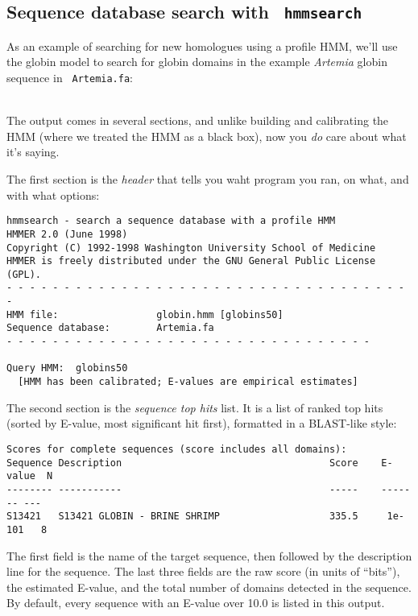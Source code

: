 \documentclass[11pt]{report}
\newcommand{\prog}[1]{\texttt{#1}}
\newcommand{\user}[1]{\noindent{\small\bfseries\texttt{$>$ #1}}\\}
\begin{document}
\subsection{Sequence database search with \prog{ hmmsearch}}

As an example of searching for new homologues using a profile HMM,
we'll use the globin model to search for globin domains in the example
{\em Artemia} globin sequence in \prog{ Artemia.fa}:

\vspace{1.5em}
\user{hmmsearch globin.hmm Artemia.fa}

The output comes in several sections, and unlike building and
calibrating the HMM (where we treated the HMM as a black box), now you
{\em do} care about what it's saying.

The first section is the {\em header} that tells you waht program you
ran, on what, and with what options:

{\small\begin{verbatim}
hmmsearch - search a sequence database with a profile HMM
HMMER 2.0 (June 1998)
Copyright (C) 1992-1998 Washington University School of Medicine
HMMER is freely distributed under the GNU General Public License (GPL).
- - - - - - - - - - - - - - - - - - - - - - - - - - - - - - - - - - - -
HMM file:                 globin.hmm [globins50]
Sequence database:        Artemia.fa
- - - - - - - - - - - - - - - - - - - - - - - - - - - - - - - -

Query HMM:  globins50  
  [HMM has been calibrated; E-values are empirical estimates]
\end{verbatim}}

The second section is the {\em sequence top hits} list. It is a list
of ranked top hits (sorted by E-value, most significant hit first),
formatted in a BLAST-like style:

{\small\begin{verbatim}
Scores for complete sequences (score includes all domains):
Sequence Description                                    Score    E-value  N 
-------- -----------                                    -----    ------- ---
S13421   S13421 GLOBIN - BRINE SHRIMP                   335.5     1e-101   8
\end{verbatim}}

The first field is the name of the target sequence, then followed by
the description line for the sequence. The last three fields are the
raw score (in units of ``bits''), the estimated E-value, and the total
number of domains detected in the sequence.  By default, every
sequence with an E-value over 10.0 is listed in this output.
\end{document}

